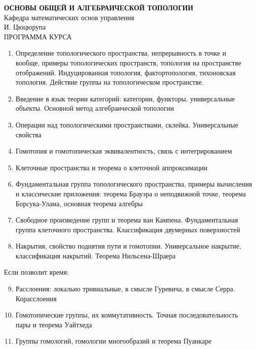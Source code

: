 \documentclass[12pt]{article}
\begin{document}
\pagestyle{empty}
\large{
\begin{center}
	\textbf{ОСНОВЫ ОБЩЕЙ И АЛГЕБРАИЧЕСКОЙ ТОПОЛОГИИ}\\
	Кафедра математических основ управления\\
	И. Цюцюрупа\\
	ПРОГРАММА КУРСА
\end{center}
}
\begin{enumerate}
	\item Определение топологического пространства, непрерывность в точке и вообще, примеры топологических пространств, топология на пространстве отображений. Индуцированная топология, фактортопология, тихоновская топология. Действие группы на топологическом пространстве. 
	\item Введение в язык теории категорий: категории, функторы, универсальные объекты. Основной метод алгебраической топологии
	\item Операции над топологическими пространствами, склейка. Универсальные свойства
	\item Гомотопия и гомотопическая эквивалентность, связь с интегрированием
	\item Клеточные пространства и теорема о клеточной аппроксимации
	\item Фундаментальная группа топологического пространства, примеры вычисления и классические приложения: теорема Брауэра о неподвижной точке, теорема Борсука-Улама, основная теорема алгебры
	\item Свободное произведение групп и теорема ван Кампена. Фундаментальная группа клеточного пространства. Классификация двумерных поверхностей
	\item Накрытия, свойство поднятия пути и гомотопии. Универсальное накрытие, классификация накрытий. Теорема Нильсена-Шраера
\end{enumerate}
Если позволит время:
\begin{enumerate}\setcounter{enumi}{8}
	\item Расслоения: локально тривиальные, в смысле Гуревича, в смысле Серра. Корасслоения
	\item Гомотопические группы, их коммутативность. Точная последовательность пары и теорема Уайтхеда
	\item Группы гомологий, гомологии многообразий и теорема Пуанкаре
\end{enumerate}
\end{document}
